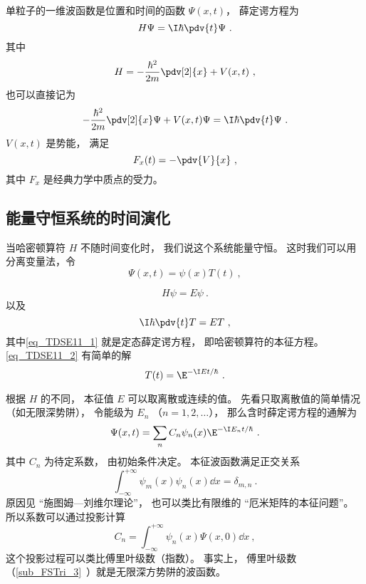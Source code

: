 
\begin{issues}
\issueDraft
\end{issues}


单粒子的一维波函数是位置和时间的函数 $\Psi(x, t)$， 薛定谔方程为
\begin{equation}
H\Psi = \I\hbar \pdv{t}\Psi~.
\end{equation}
其中
\begin{equation}
H = -\frac{\hbar^2}{2m}\pdv[2]{x} + V(x, t)~,
\end{equation}
也可以直接记为
\begin{equation}\label{eq_TDSE11_3}
-\frac{\hbar^2}{2m}\pdv[2]{x}\Psi + V(x, t)\Psi = \I\hbar \pdv{t}\Psi~.
\end{equation}
$V(x,t)$ 是势能， 满足
\begin{equation}
F_x(t) = -\pdv{V}{x}~,
\end{equation}
其中 $F_x$ 是经典力学中质点的受力。

\subsection{能量守恒系统的时间演化}
当哈密顿算符 $H$ 不随时间变化时， 我们说这个系统能量守恒。 这时我们可以用分离变量法，令
\begin{equation}
\Psi(x, t) = \psi(x) T(t)~,
\end{equation}
 
\begin{equation}\label{eq_TDSE11_1}
H\psi = E\psi~.
\end{equation}
以及
\begin{equation}\label{eq_TDSE11_2}
\I \hbar\pdv{t}T = ET~,
\end{equation}
其中\autoref{eq_TDSE11_1} 就是定态薛定谔方程， 即哈密顿算符的本征方程。 \autoref{eq_TDSE11_2} 有简单的解
\begin{equation}
T(t) = \E^{-\I E t/\hbar}~.
\end{equation}

根据 $H$ 的不同， 本征值 $E$ 可以取离散或连续的值。 先看只取离散值的简单情况（如无限深势阱）， 令能级为 $E_n$ （$n = 1, 2, \dots$）， 那么含时薛定谔方程的通解为
\begin{equation}\label{eq_TDSE11_5}
\Psi(x, t) = \sum_n C_n \psi_n(x) \E^{-\I E_n t/\hbar}~.
\end{equation}
其中 $C_n$ 为待定系数， 由初始条件决定。 本征波函数满足正交关系
\begin{equation}
\int_{-\infty}^{+\infty}\psi_m(x)\psi_n(x)\dd{x} = \delta_{m,n}~.
\end{equation}
原因见 “施图姆—刘维尔理论”， 也可以类比有限维的 “厄米矩阵的本征问题”。 所以系数可以通过投影计算
\begin{equation}
C_n = \int_{-\infty}^{+\infty} \psi_n(x)\Psi(x, 0) \dd{x}~,
\end{equation}
这个投影过程可以类比傅里叶级数（指数）。 事实上， 傅里叶级数（\autoref{sub_FSTri_3}~）就是无限深方势阱的波函数。

